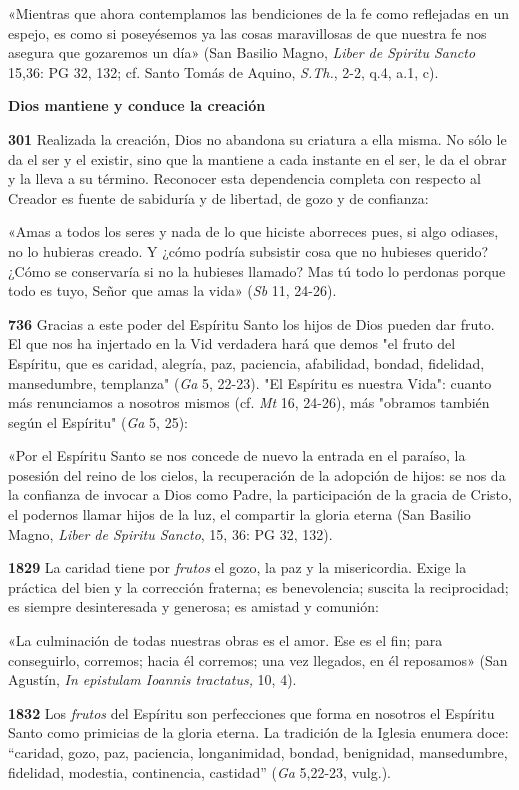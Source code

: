 \documentclass[]{article}
\begin{document}
«Mientras que ahora contemplamos las bendiciones de la fe como
reflejadas en un espejo, es como si poseyésemos ya las cosas
maravillosas de que nuestra fe nos asegura que gozaremos un día» (San
Basilio Magno, \emph{Liber de Spiritu Sancto} 15,36: PG 32, 132; cf.
Santo Tomás de Aquino, \emph{S.Th.}, 2-2, q.4, a.1, c).

\textbf{Dios mantiene y conduce la creación}

\textbf{301} Realizada la creación, Dios no abandona su criatura a ella
misma. No sólo le da el ser y el existir, sino que la mantiene a cada
instante en el ser, le da el obrar y la lleva a su término. Reconocer
esta dependencia completa con respecto al Creador es fuente de sabiduría
y de libertad, de gozo y de confianza:

«Amas a todos los seres y nada de lo que hiciste aborreces pues, si algo
odiases, no lo hubieras creado. Y ¿cómo podría subsistir cosa que no
hubieses querido? ¿Cómo se conservaría si no la hubieses llamado? Mas tú
todo lo perdonas porque todo es tuyo, Señor que amas la vida» (\emph{Sb}
11, 24-26).

\textbf{736} Gracias a este poder del Espíritu Santo los hijos de Dios
pueden dar fruto. El que nos ha injertado en la Vid verdadera hará que
demos "el fruto del Espíritu, que es caridad, alegría, paz, paciencia,
afabilidad, bondad, fidelidad, mansedumbre, templanza" (\emph{Ga} 5,
22-23). "El Espíritu es nuestra Vida": cuanto más renunciamos a nosotros
mismos (cf. \emph{Mt} 16, 24-26), más "obramos también según el
Espíritu" (\emph{Ga} 5, 25):

«Por el Espíritu Santo se nos concede de nuevo la entrada en el paraíso,
la posesión del reino de los cielos, la recuperación de la adopción de
hijos: se nos da la confianza de invocar a Dios como Padre, la
participación de la gracia de Cristo, el podernos llamar hijos de la
luz, el compartir la gloria eterna (San Basilio Magno, \emph{Liber de
Spiritu Sancto}, 15, 36: PG 32, 132).

\textbf{1829} La caridad tiene por \emph{frutos} el gozo, la paz y la
misericordia. Exige la práctica del bien y la corrección fraterna; es
benevolencia; suscita la reciprocidad; es siempre desinteresada y
generosa; es amistad y comunión:

«La culminación de todas nuestras obras es el amor. Ese es el fin; para
conseguirlo, corremos; hacia él corremos; una vez llegados, en él
reposamos» (San Agustín, \emph{In epistulam Ioannis tractatus,} 10, 4).

\textbf{1832} Los \emph{frutos} del Espíritu son perfecciones que forma
en nosotros el Espíritu Santo como primicias de la gloria eterna. La
tradición de la Iglesia enumera doce: ``caridad, gozo, paz, paciencia,
longanimidad, bondad, benignidad, mansedumbre, fidelidad, modestia,
continencia, castidad'' (\emph{Ga} 5,22-23, vulg.).
\end{document}
